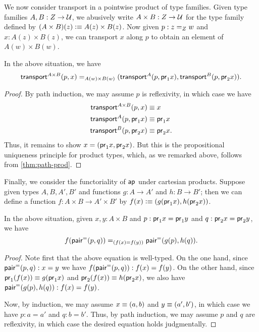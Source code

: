 %
We now consider transport in a pointwise product of type families.
Given type families $ A, B : Z \to \type$, we abusively write $A\times B:Z\to \type$ for the type family defined by $(A\times B)(z) \defeq A(z) \times B(z)$.
Now given $p : \id[Z]{z}{w}$ and $x : A(z) \times B(z)$, we can transport $x$ along $p$ to obtain an element of $A(w)\times B(w)$.

\begin{thm}\label{thm:trans-prod}
  In the above situation, we have
  \[
  \id[A(w) \times B(w)]
  {\transfib{A\times B}px}
  {(\transfib{A}{p}{\proj{1}x}, \transfib{B}{p}{\proj{2}x})}.
  \]
\end{thm}
\begin{proof}
  By path induction, we may assume $p$ is reflexivity, in which case we have
  \begin{align*}
    \transfib{A\times B}px&\jdeq x\\
    \transfib{A}{p}{\proj{1}x}&\jdeq \proj1x\\
    \transfib{B}{p}{\proj{2}x}&\jdeq \proj2x.
  \end{align*}
  Thus, it remains to show $x = (\proj1 x, \proj2x)$.
  But this is the propositional uniqueness principle for product types, which, as we remarked above, follows from \autoref{thm:path-prod}.
\end{proof}

Finally, we consider the functoriality of $\apfunc{}$ under cartesian products.
Suppose given types $A,B,A',B'$ and functions $g:A\to A'$ and $h:B\to B'$; then we can define a function $f:A\times B\to A'\times B'$ by $f(x) \defeq (g(\proj1x),h(\proj2x))$.

\begin{thm}\label{thm:ap-prod}
  In the above situation, given $x,y:A\times B$ and $p:\proj1x=\proj1y$ and $q:\proj2x=\proj2y$, we have
  \[ \id[(f(x)=f(y))]{\ap{f}{\pairpath(p,q)}} {\pairpath(\ap{g}{p},\ap{h}{q})}. \]
\end{thm}
\begin{proof}
  Note first that the above equation is well-typed.
  On the one hand, since $\pairpath(p,q):x=y$ we have $\ap{f}{\pairpath(p,q)}:f(x)=f(y)$.
  On the other hand, since $\proj1(f(x))\jdeq g(\proj1x)$ and $\proj2(f(x))\jdeq h(\proj2x)$, we also have $\pairpath(\ap{g}{p},\ap{h}{q}):f(x)=f(y)$.

  Now, by induction, we may assume $x\jdeq(a,b)$ and $y\jdeq(a',b')$, in which case we have $p:a=a'$ and $q:b=b'$.
  Thus, by path induction, we may assume $p$ and $q$ are reflexivity, in which case the desired equation holds judgmentally.
\end{proof}

